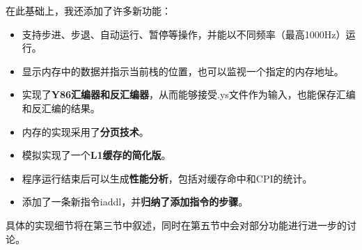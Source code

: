 在此基础上，我还添加了许多新功能：
\begin{itemize}
\item 支持步进、步退、自动运行、暂停等操作，并能以不同频率（最高1000Hz）运行。
\item 显示内存中的数据并指示当前栈的位置，也可以监视一个指定的内存地址。
\item 实现了{\bf Y86汇编器和反汇编器}，从而能够接受.ys文件作为输入，也能保存汇编和反汇编的结果。
\item 内存的实现采用了{\bf 分页技术}。
\item 模拟实现了一个{\bf L1缓存的简化版}。
\item 程序运行结束后可以生成{\bf 性能分析}，包括对缓存命中和CPI的统计。
\item 添加了一条新指令iaddl，并{\bf 归纳了添加指令的步骤}。
\end{itemize}

具体的实现细节将在第三节中叙述，同时在第五节中会对部分功能进行进一步的讨论。
